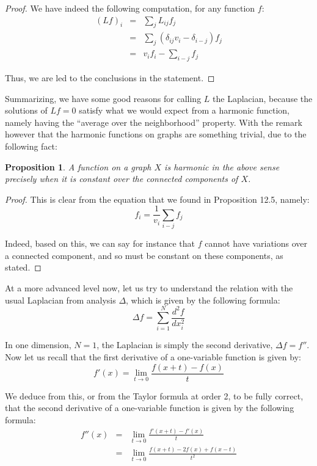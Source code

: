 \documentclass[12pt]{amsbook}
\newtheorem{proposition}[theorem]{Proposition}
\begin{document}
\begin{proof}
We have indeed the following computation, for any function $f$:
\begin{eqnarray*}
(Lf)_i
&=&\sum_jL_{ij}f_j\\
&=&\sum_j(\delta_{ij}v_i-\delta_{i-j})f_j\\
&=&v_if_i-\sum_{i-j}f_j
\end{eqnarray*}

Thus, we are led to the conclusions in the statement.
\end{proof}

Summarizing, we have some good reasons for calling $L$ the Laplacian, because the solutions of $Lf=0$ satisfy what we would expect from a harmonic function, namely having the ``average over the neighborhood'' property. With the remark however that the harmonic functions on graphs are something trivial, due to the following fact:


\begin{proposition}
A function on a graph $X$ is harmonic in the above sense precisely when it is constant over the connected components of $X$.
\end{proposition}

\begin{proof}
This is clear from the equation that we found in Proposition 12.5, namely:
$$f_i=\frac{1}{v_i}\sum_{i-j}f_j$$

Indeed, based on this, we can say for instance that $f$ cannot have variations over a connected component, and so must be constant on these components, as stated.
\end{proof}

At a more advanced level now, let us try to understand the relation with the usual Laplacian from analysis $\Delta$, which is given by the following formula:
$$\Delta f=\sum_{i=1}^N\frac{d^2f}{dx_i^2}$$

In one dimension, $N=1$, the Laplacian is simply the second derivative, $\Delta f=f''$. Now let us recall that the first derivative of a one-variable function is given by:
$$f'(x)=\lim_{t\to 0}\frac{f(x+t)-f(x)}{t}$$

We deduce from this, or from the Taylor formula at order 2, to be fully correct, that the second derivative of a one-variable function is given by the following formula:
\begin{eqnarray*}
f''(x)
&=&\lim_{t\to 0}\frac{f'(x+t)-f'(x)}{t}\\
&=&\lim_{t\to 0}\frac{f(x+t)-2f(x)+f(x-t)}{t^2}
\end{eqnarray*}
\end{document}
